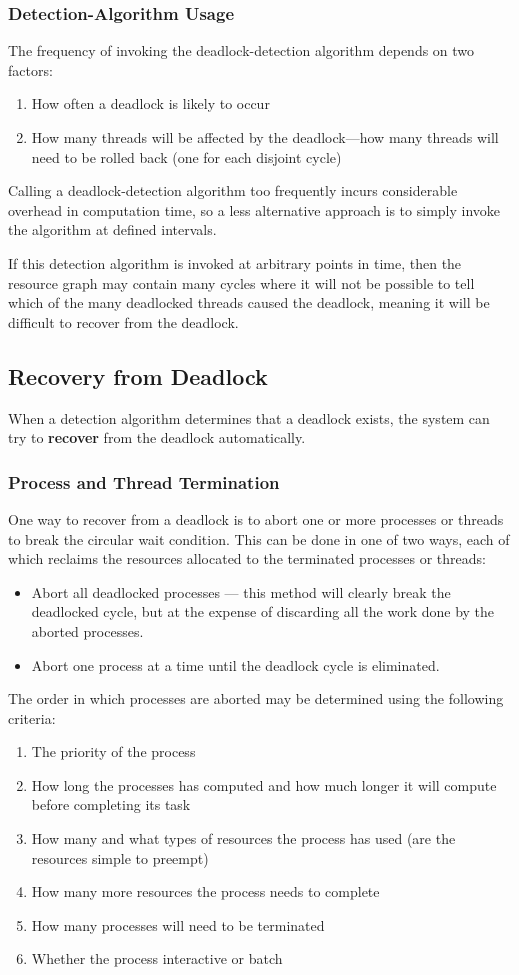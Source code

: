 \documentclass{article}
\begin{document}
\subsubsection{Detection-Algorithm Usage}
The frequency of invoking the deadlock-detection algorithm depends on
two factors:
\begin{enumerate}
    \item How often a deadlock is likely to occur
    \item How many threads will be affected by the deadlock---how many
          threads will need to be rolled back (one for each disjoint
          cycle)
\end{enumerate}
Calling a deadlock-detection algorithm too frequently incurs
considerable overhead in computation time, so a less alternative approach
is to simply invoke the algorithm at defined intervals.

If this detection algorithm is invoked at arbitrary points in time,
then the resource graph may contain many cycles where it will not be
possible to tell which of the many deadlocked threads caused the
deadlock, meaning it will be difficult to recover from the deadlock.
\subsection{Recovery from Deadlock}
When a detection algorithm determines that a deadlock exists, the
system can try to \textbf{recover} from the deadlock automatically.
\subsubsection{Process and Thread Termination}
One way to recover from a deadlock is to abort one or more processes or
threads to break the circular wait condition. This can be done in one
of two ways, each of which reclaims the resources allocated to the
terminated processes or threads:
\begin{itemize}
    \item Abort all deadlocked processes --- this method will clearly
          break the deadlocked cycle, but at the expense of discarding
          all the work done by the aborted processes.
    \item Abort one process at a time until the deadlock cycle is
          eliminated.
\end{itemize}
The order in which processes are aborted may be determined using the following criteria:
\begin{enumerate}
    \item The priority of the process
    \item How long the processes has computed and how much longer it
          will compute before completing its task
    \item How many and what types of resources the process has used
          (are the resources simple to preempt)
    \item How many more resources the process needs to complete
    \item How many processes will need to be terminated
    \item Whether the process interactive or batch
\end{enumerate}
\end{document}
